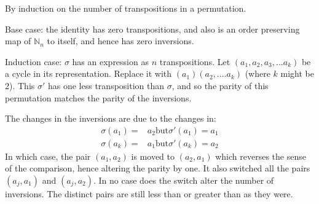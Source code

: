 \documentclass[11pt,oneside]{article}
\numberwithin{equation}{section}
\theoremstyle{definition}
\newtheorem{exercise}{Exercise}
\def\NN{\mathbb{N}}
\begin{document}
\begin{solution}
  By induction on the number of transpositions in a permutation.

  Base case: the identity has zero transpositions, and also is an
  order preserving map of $\NN_n$ to itself, and hence has zero
  inversions.

  Induction case: $\sigma$ has an expression as $n$
  transpositions. Let $(a _ 1, a_2, a_3, ... a_k)$ be a cycle in its
  representation. Replace it with $(a_1) (a_2,. ... a_k)$ (where $k$
  might be 2).  This $ \sigma ' $ has one less transposition than $\sigma$, and so the parity
  of this permutation matches the parity of the inversions.

  The changes in the inversions are due to the changes in:
  \begin{align*}
    \sigma ( a_1 ) = & a_2  \text{but}  \sigma ' (a_1) = a_1 \\
    \sigma ( a_k) = & a_1 \text{but} \sigma ' (a_k) = a_2
  \end{align*}
  In which case, the pair $(a_1, a_2) $ is moved to $(a_2, a_1)$ which
  reverses the sense of the comparison, hence altering the parity by
  one.  It also switched all the pairs $(a_j, a_1)$ and $(a_j, a_2)$.
  In no case does the switch alter the number of inversions. The
  distinct pairs are still less than or greater than as they were.  
\end{solution}

\begin{comment}
  \begin{exercise}
    problem
  \end{exercise}
  \begin{solution}
    \begin{enumerate}[(a)]
    \item
      first answer
    \end{enumerate}
  \end{solution}
\end{comment}
\end{document}
